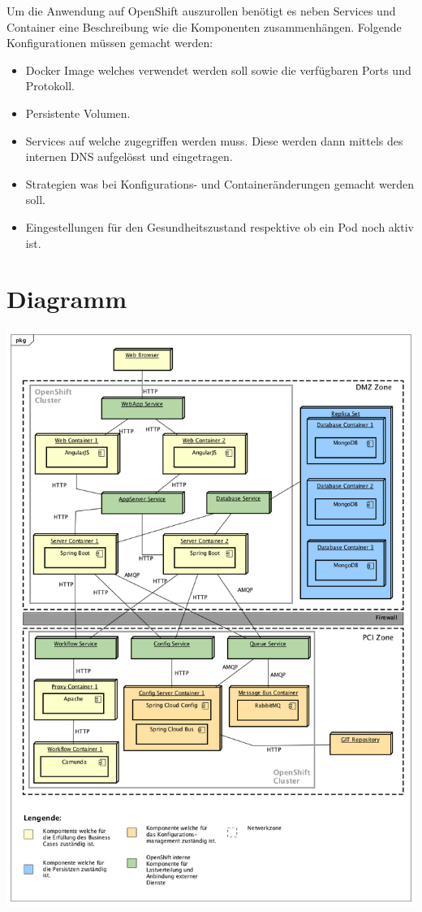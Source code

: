 Um die Anwendung auf OpenShift auszurollen benötigt es neben Services und Container eine Beschreibung wie die Komponenten zusammenhängen. Folgende Konfigurationen müssen gemacht werden:\newline
\begin{itemize}
	\item Docker Image welches verwendet werden soll sowie die verfügbaren Ports und Protokoll.
	\item Persistente Volumen.
	\item Services auf welche zugegriffen werden muss. Diese werden dann mittels des internen DNS aufgelösst und eingetragen.
	\item Strategien was bei Konfigurations- und Containeränderungen gemacht werden soll.
	\item Eingestellungen für den Gesundheitszustand respektive ob ein Pod noch aktiv ist.
\end{itemize}


\section{Diagramm}
\label{deploy-dia}
\begin{center}
	\includegraphics[scale=0.45]{OpenShiftDeployment.png}
\end{center}

